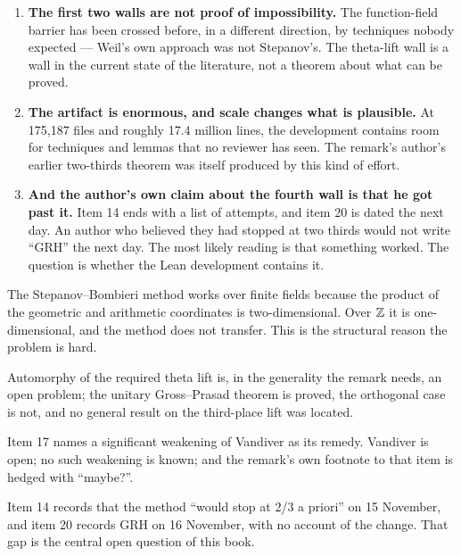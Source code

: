 \begin{enumerate}
\item \textbf{The first two walls are not proof of impossibility.} The
function-field barrier has been crossed before, in a different direction, by
techniques nobody expected --- Weil's own approach was not Stepanov's. The
theta-lift wall is a wall in the current state of the literature, not a
theorem about what can be proved.
\item \textbf{The artifact is enormous, and scale changes what is plausible.}
At 175{,}187 files and roughly 17.4 million lines, the development contains
room for techniques and lemmas that no reviewer has seen. The remark's
author's earlier two-thirds theorem was itself produced by this kind of
effort.
\item \textbf{And the author's own claim about the fourth wall is that he got
past it.} Item 14 ends with a list of attempts, and item 20 is dated the next
day. An author who believed they had stopped at two thirds would not write
``GRH'' the next day. The most likely reading is that something worked. The
question is whether the Lean development contains it.
\end{enumerate}

\begin{keytakeaways}

\item The Stepanov--Bombieri method works over finite fields because the
product of the geometric and arithmetic coordinates is two-dimensional. Over
$\mathbb{Z}$ it is one-dimensional, and the method does not transfer. This is the
structural reason the problem is hard.
\item Automorphy of the required theta lift is, in the generality the remark
needs, an open problem; the unitary Gross--Prasad theorem is proved, the
orthogonal case is not, and no general result on the third-place lift was
located.
\item Item 17 names a significant weakening of Vandiver as its remedy.
Vandiver is open; no such weakening is known; and the remark's own footnote
to that item is hedged with ``maybe?''.
\item Item 14 records that the method ``would stop at 2/3 a priori'' on
15 November, and item 20 records GRH on 16 November, with no account of the
change. That gap is the central open question of this book.
\end{keytakeaways}
